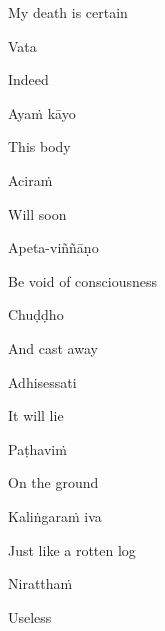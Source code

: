 \begin{english}
  My death is certain
\end{english}

\suttaRef{[Dhp A]}

\ifafive\clearpage\fi

Vata

\ifbfive\enlargethispage{1\baselineskip}\fi

\begin{english}
  Indeed
\end{english}

Ayaṁ kāyo

\begin{english}
  This body
\end{english}

Aciraṁ

\begin{english}
  Will soon
\end{english}

Apeta-viññāṇo

\begin{english}
  Be void of consciousness
\end{english}

Chuḍḍho

\begin{english}
  And cast away
\end{english}

Adhisessati

\begin{english}
  It will lie
\end{english}

Paṭhaviṁ

\begin{english}
  On the ground
\end{english}

Kaliṅgaraṁ iva

\begin{english}
  Just like a rotten log
\end{english}

\ifninebythirteen\clearpage\fi

Niratthaṁ

\begin{english}
  Useless\ifdigital\makeatletter\hyperlink{endnote105-appendix}\makeatother\fi
\end{english}

